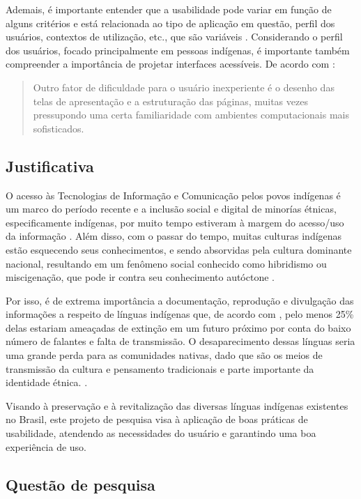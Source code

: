 Ademais, é importante entender que a usabilidade pode variar em função de alguns critérios e está relacionada ao tipo de aplicação em questão, perfil dos usuários,
contextos de utilização, etc., que são variáveis \cite{winckler2022}. Considerando o perfil dos usuários, focado principalmente em pessoas indígenas, é importante também
compreender a importância de projetar interfaces acessíveis. De acordo com :

\begin{quote}
    Outro fator de dificuldade para o usuário inexperiente é o desenho das telas de apresentação e a estruturação das páginas, muitas vezes pressupondo uma certa
    familiaridade com ambientes computacionais mais sofisticados.

\end{quote}

\subsection{Justificativa}
\label{sec:Justificativa}

O acesso às Tecnologias de Informação e Comunicação pelos povos indígenas é um marco do período recente e a inclusão social e digital de minorías étnicas, especificamente
indígenas, por muito tempo estiveram à margem do acesso/uso da informação \cite{pinto2010}. Além disso, com o passar do tempo, muitas culturas indígenas estão esquecendo
seus conhecimentos, e sendo absorvidas pela cultura dominante nacional, resultando em um fenômeno social conhecido como hibridismo ou miscigenação, que pode ir contra seu
conhecimento autóctone \cite{pinto2010}.

Por isso, é de extrema importância a documentação, reprodução e divulgação das informações a respeito de línguas indígenas que, de acordo com \cite{moore2008}, pelo menos
25\% delas estariam ameaçadas de extinção em um futuro próximo por conta do baixo número de falantes e falta de transmissão. O desaparecimento dessas línguas seria uma
grande perda para as comunidades nativas, dado que são os meios de transmissão da cultura e pensamento tradicionais e parte importante da identidade étnica.
\cite{moore2008}.

Visando à preservação e à revitalização das diversas línguas indígenas existentes no Brasil, este projeto de pesquisa visa à aplicação de boas práticas de usabilidade,
atendendo as necessidades do usuário e garantindo uma boa experiência de uso.


\subsection{Questão de pesquisa}
\label{sec:QuestaodePesquisa}

